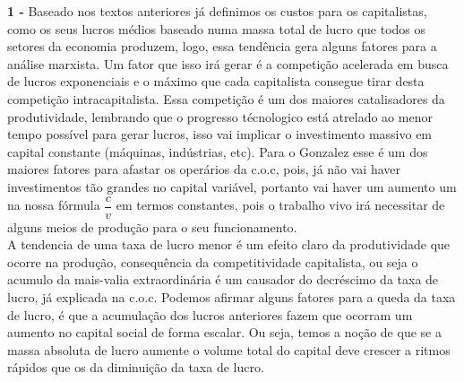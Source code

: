 \documentclass[a4paper, 12pt]{article} %
\begin{document}
\par \textbf{1 -} Baseado nos textos anteriores já definimos os custos para os capitalistas, como os seus lucros médios baseado numa massa total de lucro que todos os setores da economia produzem, logo, essa tendência gera alguns fatores para a análise marxista. Um fator que isso irá gerar é a competição acelerada em busca de lucros exponenciais e o máximo que cada capitalista consegue tirar desta competição intracapitalista. Essa competição é um dos maiores catalisadores da produtividade, lembrando que o progresso técnologico está atrelado ao menor tempo possível para gerar lucros, isso vai implicar o investimento massivo em capital constante (máquinas, indústrias, etc). Para o Gonzalez esse é um dos maiores fatores para afastar os operários da c.o.c, pois, já não vai haver investimentos tão grandes no capital variável, portanto vai haver um aumento um na nossa fórmula $\dfrac{c}{v}$ em termos constantes, pois o trabalho vivo irá necessitar de alguns meios de produção para o seu funcionamento.
\\
A tendencia de uma taxa de lucro menor é um efeito claro da produtividade que ocorre na produção, consequência da competitividade capitalista, ou seja o acumulo da mais-valia extraordinária é um causador do decréscimo da taxa de lucro, já explicada na c.o.c. Podemos afirmar alguns fatores para a queda da taxa de lucro, é que a acumulação dos lucros anteriores fazem que ocorram um aumento no capital social de forma escalar. Ou seja, temos a noção de que se a massa absoluta de lucro aumente o volume total do capital deve crescer a ritmos rápidos que os da diminuição da taxa de lucro.

\vspace{0.5cm}
\end{document}
